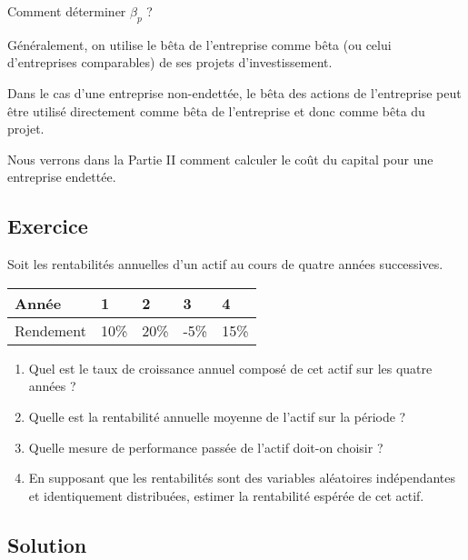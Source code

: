 \documentclass[a4paper, 12pt]{report}
\begin{document}
Comment déterminer $\beta_p$ ?

Généralement, on utilise le bêta de l'entreprise comme bêta (ou celui d'entreprises comparables) de ses projets d'investissement.

Dans le cas d'une entreprise non-endettée, le bêta des actions de l'entreprise peut être utilisé directement comme bêta de l'entreprise et donc comme bêta du projet.

Nous verrons dans la Partie II comment calculer le coût du capital pour une entreprise endettée.

\subsection{Exercice}

Soit les rentabilités annuelles d'un actif au cours de quatre années successives.

\begin{center}
	\begin{tabular}{@{}lllll@{}}
	\toprule
	Année     & 1    & 2    & 3    & 4    \\ \midrule
	Rendement & 10\% & 20\% & -5\% & 15\% \\ \bottomrule
\end{tabular}
\end{center}

\begin{enumerate}
	\item Quel est le taux de croissance annuel composé de cet actif sur les quatre années ?
	\item Quelle est la rentabilité annuelle moyenne de l'actif sur la période ?
	\item Quelle mesure de performance passée de l'actif doit-on choisir ?
	\item En supposant que les rentabilités sont des variables aléatoires indépendantes et identiquement distribuées, estimer la rentabilité espérée de  cet actif.
\end{enumerate}

\subsection{Solution}
\end{document}
